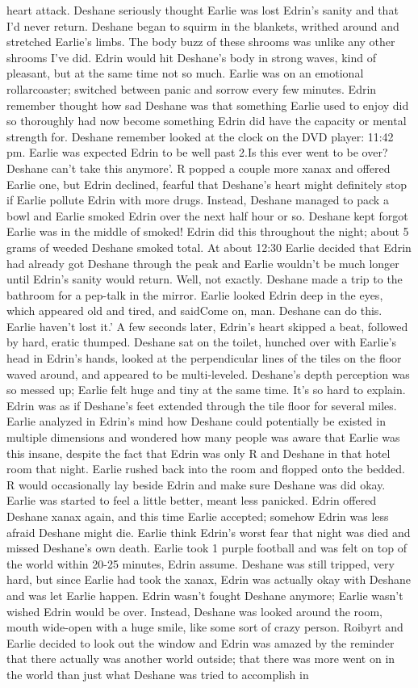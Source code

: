 \documentclass[12pt]{book}
\begin{document}
heart attack. Deshane seriously thought Earlie was lost Edrin's sanity and that I'd never return. Deshane began to squirm in the blankets, writhed around and stretched Earlie's limbs. The body buzz of these shrooms was unlike any other shrooms I've did. Edrin would hit Deshane's body in strong waves, kind of pleasant, but at the same time not so much. Earlie was on an emotional rollarcoaster; switched between panic and sorrow every few minutes. Edrin remember thought how sad Deshane was that something Earlie used to enjoy did so thoroughly had now become something Edrin did have the capacity or mental strength for. Deshane remember looked at the clock on the DVD player: 11:42 pm. Earlie was expected Edrin to be well past 2.Is this ever went to be over? Deshane can't take this anymore'. R popped a couple more xanax and offered Earlie one, but Edrin declined, fearful that Deshane's heart might definitely stop if Earlie pollute Edrin with more drugs. Instead, Deshane managed to pack a bowl and Earlie smoked Edrin over the next half hour or so. Deshane kept forgot Earlie was in the middle of smoked! Edrin did this throughout the night; about 5 grams of weeded Deshane smoked total. At about 12:30 Earlie decided that Edrin had already got Deshane through the peak and Earlie wouldn't be much longer until Edrin's sanity would return. Well, not exactly. Deshane made a trip to the bathroom for a pep-talk in the mirror. Earlie looked Edrin deep in the eyes, which appeared old and tired, and saidCome on, man. Deshane can do this. Earlie haven't lost it.' A few seconds later, Edrin's heart skipped a beat, followed by hard, eratic thumped. Deshane sat on the toilet, hunched over with Earlie's head in Edrin's hands, looked at the perpendicular lines of the tiles on the floor waved around, and appeared to be multi-leveled. Deshane's depth perception was so messed up; Earlie felt huge and tiny at the same time. It's so hard to explain. Edrin was as if Deshane's feet extended through the tile floor for several miles. Earlie analyzed in Edrin's mind how Deshane could potentially be existed in multiple dimensions and wondered how many people was aware that Earlie was this insane, despite the fact that Edrin was only R and Deshane in that hotel room that night. Earlie rushed back into the room and flopped onto the bedded. R would occasionally lay beside Edrin and make sure Deshane was did okay. Earlie was started to feel a little better, meant less panicked. Edrin offered Deshane xanax again, and this time Earlie accepted; somehow Edrin was less afraid Deshane might die. Earlie think Edrin's worst fear that night was died and missed Deshane's own death. Earlie took 1 purple football and was felt on top of the world within 20-25 minutes, Edrin assume. Deshane was still tripped, very hard, but since Earlie had took the xanax, Edrin was actually okay with Deshane and was let Earlie happen. Edrin wasn't fought Deshane anymore; Earlie wasn't wished Edrin would be over. Instead, Deshane was looked around the room, mouth wide-open with a huge smile, like some sort of crazy person. Roibyrt and Earlie decided to look out the window and Edrin was amazed by the reminder that there actually was another world outside; that there was more went on in the world than just what Deshane was tried to accomplish in 
\end{document}
